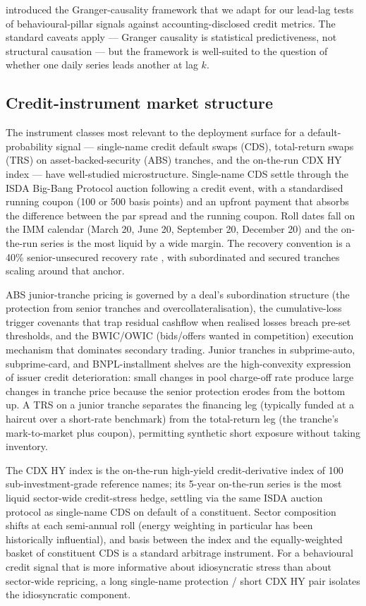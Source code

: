 \documentclass[11pt,a4paper]{article}
\begin{document}
\citet{granger1969investigating} introduced the Granger-causality framework that we adapt for our lead-lag tests of behavioural-pillar signals against accounting-disclosed credit metrics. The standard caveats apply --- Granger causality is statistical predictiveness, not structural causation --- but the framework is well-suited to the question of whether one daily series leads another at lag $k$.

\subsection{Credit-instrument market structure}\label{sec:lit_credit}

The instrument classes most relevant to the deployment surface for a default-probability signal --- single-name credit default swaps (CDS), total-return swaps (TRS) on asset-backed-security (ABS) tranches, and the on-the-run CDX HY index --- have well-studied microstructure. Single-name CDS settle through the ISDA Big-Bang Protocol auction following a credit event, with a standardised running coupon (100 or 500 basis points) and an upfront payment that absorbs the difference between the par spread and the running coupon. Roll dates fall on the IMM calendar (March 20, June 20, September 20, December 20) and the on-the-run series is the most liquid by a wide margin. The recovery convention is a 40\% senior-unsecured recovery rate \citep{moodys2024recovery}, with subordinated and secured tranches scaling around that anchor.

ABS junior-tranche pricing is governed by a deal's subordination structure (the protection from senior tranches and overcollateralisation), the cumulative-loss trigger covenants that trap residual cashflow when realised losses breach pre-set thresholds, and the BWIC/OWIC (bids/offers wanted in competition) execution mechanism that dominates secondary trading. Junior tranches in subprime-auto, subprime-card, and BNPL-installment shelves are the high-convexity expression of issuer credit deterioration: small changes in pool charge-off rate produce large changes in tranche price because the senior protection erodes from the bottom up. A TRS on a junior tranche separates the financing leg (typically funded at a haircut over a short-rate benchmark) from the total-return leg (the tranche's mark-to-market plus coupon), permitting synthetic short exposure without taking inventory.

The CDX HY index is the on-the-run high-yield credit-derivative index of 100 sub-investment-grade reference names; its 5-year on-the-run series is the most liquid sector-wide credit-stress hedge, settling via the same ISDA auction protocol as single-name CDS on default of a constituent. Sector composition shifts at each semi-annual roll (energy weighting in particular has been historically influential), and basis between the index and the equally-weighted basket of constituent CDS is a standard arbitrage instrument. For a behavioural credit signal that is more informative about idiosyncratic stress than about sector-wide repricing, a long single-name protection / short CDX HY pair isolates the idiosyncratic component.
\end{document}
